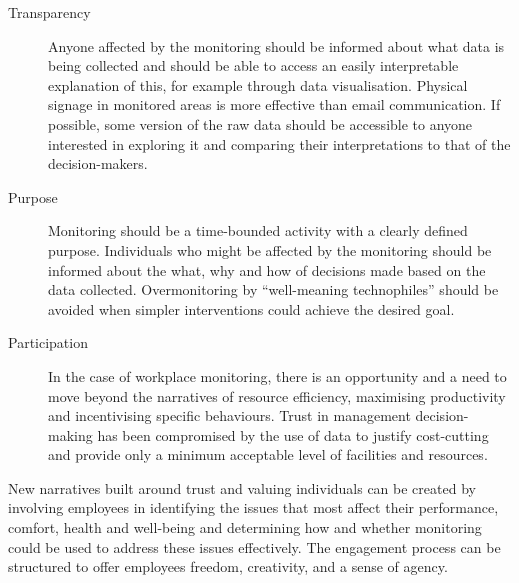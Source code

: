 \begin{description}
\item[Transparency] Anyone affected by the monitoring should be
informed about what data is being collected and should be able to
access an easily interpretable explanation of this, for example
through data visualisation. Physical signage in monitored areas is
more effective than email communication. If possible, some version of
the raw data should be accessible to anyone interested in exploring it
and comparing their interpretations to that of the decision-makers. 

\item[Purpose] Monitoring should be a time-bounded activity with
a clearly defined purpose. Individuals who might be affected by the
monitoring should be informed about the what, why and how of decisions
made based on the data collected. Overmonitoring by “well-meaning
technophiles” should be avoided when simpler interventions could
achieve the desired goal. 

\item[Participation] In the case of workplace monitoring, there
is an opportunity and a need to move beyond the narratives of resource
efficiency, maximising productivity and incentivising specific
behaviours. Trust in management decision-making has been compromised
by the use of data to justify cost-cutting and provide only a minimum
acceptable level of facilities and resources. 
\end{description}



New narratives built around trust and valuing individuals can be
created by involving employees in identifying the issues that most
affect their performance, comfort, health and well-being and
determining how and whether monitoring could be used to address these
issues effectively. The engagement process can be structured to offer
employees freedom, creativity, and a sense of agency. 


